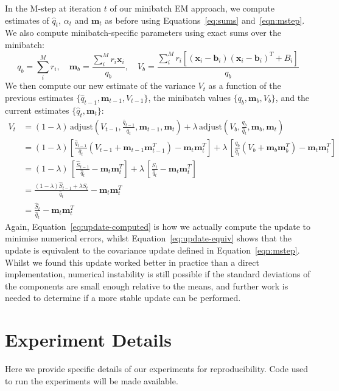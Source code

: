 \documentclass{article}
\newcommand{\bx}{\mathbf{x}}
\newcommand{\bm}{\mathbf{m}}
\newcommand{\bb}{\mathbf{b}}
\begin{document}
In the M-step at iteration $t$ of our minibatch EM approach, we compute estimates of $\hat{q}_t$, $\alpha_t$ and $\bm_t$ as before using Equations~\ref{eq:sums} and~\ref{eqn:mstep}.
We also compute minibatch-specific parameters using exact sums over the minibatch:
\begin{equation}
q_b = \sum_i^M r_i, \quad
\bm_b = \frac{\sum_i^M r_i \bx_i}{q_b},\quad V_b = \frac{\sum_i^M r_i[(\bx_i - \bb_i)(\bx_i - \bb_i)^T  + B_i]}{q_b}
\end{equation}{}
We then compute our new estimate of the variance $V_t$ as a function of the previous estimates $\{\hat{q}_{t-1}, \bm_{t-1}, V_{t-1} \}$, the minibatch values $\{q_b, \bm_b, V_b\}$, and the current estimates $\{\hat{q}_t,\bm_t \}$:
\begin{align}
V_{t} &= (1 - \lambda)\,\text{adjust}(V_{t-1}, \frac{\hat{q}_{t-1}}{\hat{q}_t}, \bm_{t-1}, \bm_t) + \lambda\, \text{adjust}(V_{b}, \frac{q_b}{\hat{q}_t}, \bm_{b}, \bm_{t}) \label{eq:update-computed}\\
&= (1 - \lambda) \left[\frac{\hat{q}_{t-1}}{\hat{q}_t} \left(V_{t-1} + \bm_{t-1}\bm_{t-1}^T \right) -\bm_t \bm_t^T \right] + \lambda\,\left[\frac{q_b}{\hat{q}_t} \left(V_{b} + \bm_{b}\bm_{b}^T \right) -\bm_t \bm_t^T \right] \\
&= (1 - \lambda)\,\left[\frac{\hat{S}_{t-1}}{\hat{q}_t} -\bm_t \bm_t^T \right] + \lambda\, \left[\frac{S_t}{\hat{q}_t} -\bm_t \bm_t^T \right] \\
&= \frac{(1- \lambda)\hat{S}_{t-1} + \lambda S_t}{\hat{q}_t} - \bm_t\bm_t^T \\
&= \frac{\hat{S}_t}{\hat{q}_t} - \bm_t\bm_t^T \label{eq:update-equiv}
\end{align}
Again, Equation~\ref{eq:update-computed} is how we actually compute the update to minimise numerical errors, whilst Equation~\ref{eq:update-equiv} shows that the update is equivalent to the covariance update defined in Equation~\ref{eqn:mstep}.
Whilst we found this update worked better in practice than a direct implementation, numerical instability is still possible if the standard deviations of the components are small enough relative to the means, and further work is needed to determine if a more stable update can be performed.

\section{Experiment Details}
\label{apx:repro}

Here we provide specific details of our experiments for reproducibility.
Code used to run the experiments will be made available.
\end{document}
